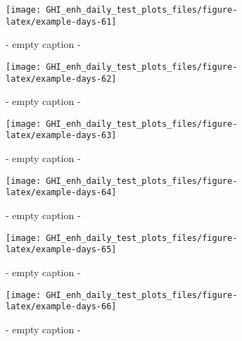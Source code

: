 \documentclass[
  10pt,
  a4paper,oneside]{article}
\begin{document}
\begin{figure}[H]

{\centering \texttt{[image: GHI\_enh\_daily\_test\_plots\_files/figure-latex/example-days-61]} 

}

\caption{ - empty caption - }\label{fig:example-days-61}
\end{figure}

\begin{figure}[H]

{\centering \texttt{[image: GHI\_enh\_daily\_test\_plots\_files/figure-latex/example-days-62]} 

}

\caption{ - empty caption - }\label{fig:example-days-62}
\end{figure}

\begin{figure}[H]

{\centering \texttt{[image: GHI\_enh\_daily\_test\_plots\_files/figure-latex/example-days-63]} 

}

\caption{ - empty caption - }\label{fig:example-days-63}
\end{figure}

\begin{figure}[H]

{\centering \texttt{[image: GHI\_enh\_daily\_test\_plots\_files/figure-latex/example-days-64]} 

}

\caption{ - empty caption - }\label{fig:example-days-64}
\end{figure}

\begin{figure}[H]

{\centering \texttt{[image: GHI\_enh\_daily\_test\_plots\_files/figure-latex/example-days-65]} 

}

\caption{ - empty caption - }\label{fig:example-days-65}
\end{figure}

\begin{figure}[H]

{\centering \texttt{[image: GHI\_enh\_daily\_test\_plots\_files/figure-latex/example-days-66]} 

}

\caption{ - empty caption - }\label{fig:example-days-66}
\end{figure}
\end{document}
